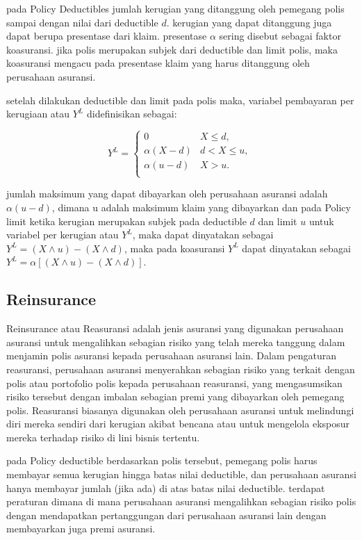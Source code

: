 \documentclass[
]{book}
\begin{document}
pada Policy Deductibles jumlah kerugian yang ditanggung oleh pemegang polis sampai dengan nilai dari deductible \(d\). kerugian yang dapat ditanggung juga dapat berupa presentase dari klaim. presentase \(\alpha\) sering disebut sebagai faktor koasuransi. jika polis merupakan subjek dari deductible dan limit polis, maka koasuransi mengacu pada presentase klaim yang harus ditanggung oleh perusahaan asuransi.

setelah dilakukan deductible dan limit pada polis maka, variabel pembayaran per kerugiaan atau \(Y^L\) didefinisikan sebagai:

\[
Y^{L} = \left\{ \begin{matrix}
0 & X \leq d, \\
\alpha\left( X - d \right) & d <  X \leq u, \\
\alpha\left( u - d \right) & X > u. \\
\end{matrix} \right.\
\]

jumlah maksimum yang dapat dibayarkan oleh perusahaan asuransi adalah \(\alpha (u-d)\), dimana u adalah maksimum klaim yang dibayarkan dan pada Policy limit ketika kerugian merupakan subjek pada deductible \(d\) dan limit \(u\) untuk variabel per kerugian atau \(Y^L\), maka dapat dinyatakan sebagai \(Y^L=(X\land u)-(X\land d)\), maka pada koasuransi \(Y^L\) dapat dinyatakan sebagai\(Y^L=\alpha[(X\land u)-(X\land d)]\).

\hypertarget{reinsurance}{%
\subsection{Reinsurance}\label{reinsurance}}

Reinsurance atau Reasuransi adalah jenis asuransi yang digunakan perusahaan asuransi untuk mengalihkan sebagian risiko yang telah mereka tanggung dalam menjamin polis asuransi kepada perusahaan asuransi lain. Dalam pengaturan reasuransi, perusahaan asuransi menyerahkan sebagian risiko yang terkait dengan polis atau portofolio polis kepada perusahaan reasuransi, yang mengasumsikan risiko tersebut dengan imbalan sebagian premi yang dibayarkan oleh pemegang polis. Reasuransi biasanya digunakan oleh perusahaan asuransi untuk melindungi diri mereka sendiri dari kerugian akibat bencana atau untuk mengelola eksposur mereka terhadap risiko di lini bisnis tertentu.

pada Policy deductible berdasarkan polis tersebut, pemegang polis harus membayar semua kerugian hingga batas nilai deductible, dan perusahaan asuransi hanya membayar jumlah (jika ada) di atas batas nilai deductible. terdapat peraturan dimana di mana perusahaan asuransi mengalihkan sebagian risiko polis dengan mendapatkan pertanggungan dari perusahaan asuransi lain dengan membayarkan juga premi asuransi.
\end{document}
